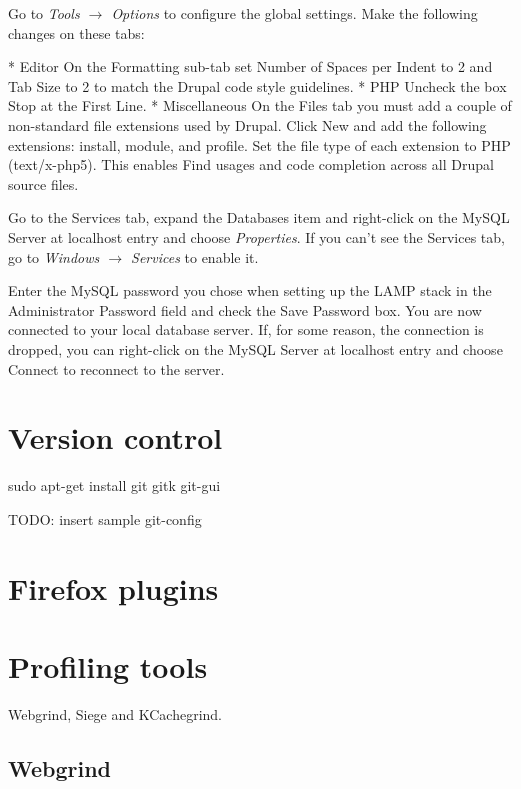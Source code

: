 \documentclass[ebook,10pt,twoside,openright]{memoir}
\begin{document}
Go to \emph{Tools $\rightarrow$ Options} to configure the global settings. Make the following changes on these tabs:

    * Editor On the Formatting sub-tab set Number of Spaces per Indent to 2 and Tab Size to 2 to match the Drupal code style guidelines.
    * PHP Uncheck the box Stop at the First Line.
    * Miscellaneous On the Files tab you must add a couple of non-standard file extensions used by Drupal. Click New and add the following extensions: install, module, and profile. Set the file type of each extension to PHP (text/x-php5). This enables Find usages and code completion across all Drupal source files.

Go to the Services tab, expand the Databases item and right-click on the MySQL Server at localhost entry and choose \emph{Properties}. If you can’t see the Services tab, go to \emph{Windows $\rightarrow$ Services} to enable it.

Enter the MySQL password you chose when setting up the LAMP stack in the Administrator Password field and check the Save Password box. You are now connected to your local database server. If, for some reason, the connection is dropped, you can right-click on the MySQL Server at localhost entry and choose Connect to reconnect to the server.

\section{Version control}

\begin{squashboxcommand}
sudo apt-get install git gitk git-gui
\end{squashboxcommand}

TODO: insert sample git-config

\section{Firefox plugins}


\section{Profiling tools}

Webgrind, Siege and KCachegrind.

\subsection{Webgrind}
\end{document}
